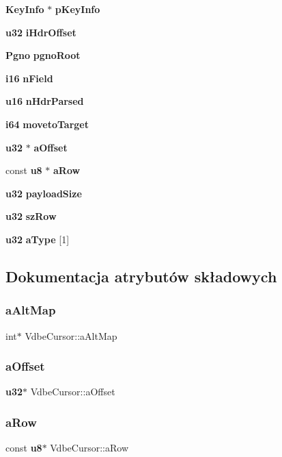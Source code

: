 \begin{DoxyCompactItemize}
\begin{tabbing}
\end{tabbing}\item 
\textbf{ Key\+Info} $\ast$ \textbf{ p\+Key\+Info}
\item 
\textbf{ u32} \textbf{ i\+Hdr\+Offset}
\item 
\textbf{ Pgno} \textbf{ pgno\+Root}
\item 
\textbf{ i16} \textbf{ n\+Field}
\item 
\textbf{ u16} \textbf{ n\+Hdr\+Parsed}
\item 
\textbf{ i64} \textbf{ moveto\+Target}
\item 
\textbf{ u32} $\ast$ \textbf{ a\+Offset}
\item 
const \textbf{ u8} $\ast$ \textbf{ a\+Row}
\item 
\textbf{ u32} \textbf{ payload\+Size}
\item 
\textbf{ u32} \textbf{ sz\+Row}
\item 
\textbf{ u32} \textbf{ a\+Type} [1]
\end{DoxyCompactItemize}


\subsection{Dokumentacja atrybutów składowych}
\mbox{\label{struct_vdbe_cursor_a78b9a4b46b24e0f7a6b6b58e1e51c2ac}} 
\subsubsection{aAltMap}
{\footnotesize\ttfamily int$\ast$ Vdbe\+Cursor\+::a\+Alt\+Map}

\mbox{\label{struct_vdbe_cursor_a17431e67b341282aeb6c026cd01ec1e9}} 
\subsubsection{aOffset}
{\footnotesize\ttfamily \textbf{ u32}$\ast$ Vdbe\+Cursor\+::a\+Offset}

\mbox{\label{struct_vdbe_cursor_a6b6f7444963e83e48cd3d63edf539c94}} 
\subsubsection{aRow}
{\footnotesize\ttfamily const \textbf{ u8}$\ast$ Vdbe\+Cursor\+::a\+Row}


